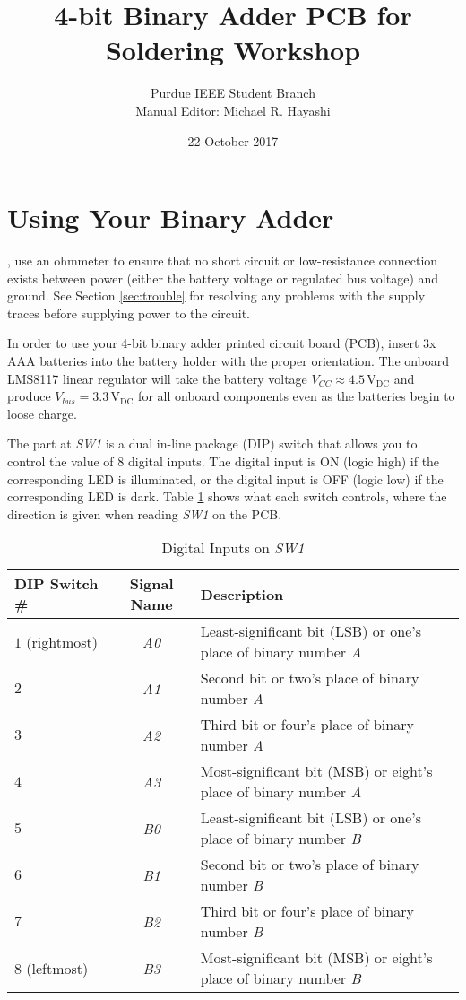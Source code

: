 \documentclass[11pt,oneside]{article}
\title{4-bit Binary Adder PCB for Soldering Workshop}
\author{Purdue IEEE Student Branch \\ Manual Editor: Michael R. Hayashi}
\date{22 October 2017}
\begin{document}
\maketitle
\tableofcontents

\section{Using Your Binary Adder}
\label{sec:using}

\textbf{\color{IEEE-red}{Before powering on your populated printed circuit board}}, use an ohmmeter to ensure that no short circuit or low-resistance connection exists between power (either the battery voltage or regulated bus voltage) and ground. See Section \ref{sec:trouble} for resolving any problems with the supply traces before supplying power to the circuit.

In order to use your 4-bit binary adder printed circuit board (PCB), insert 3x AAA batteries into the battery holder with the proper orientation. The onboard LMS8117 linear regulator will take the battery voltage $V_{CC} \approx 4.5 \, \mathrm{V_{DC}}$ and produce $V_{bus} = 3.3 \, \mathrm{V_{DC}}$ for all onboard components even as the batteries begin to loose charge.

The part at \textit{SW1} is a dual in-line package (DIP) switch that allows you to control the value of 8 digital inputs. The digital input is ON (logic high) if the corresponding LED is illuminated, or the digital input is OFF (logic low) if the corresponding LED is dark. Table \ref{tab:dig_input} shows what each switch controls, where the direction is given when reading \textit{SW1} on the PCB.

\begin{table}[!htb]
	\centering
	\caption{Digital Inputs on \textit{SW1}}
	\begin{tabular}{l | c | l}
		\hline
		DIP Switch \# & Signal Name & Description \\
		\hline
		$1$ (rightmost) & \textit{A0} & Least-significant bit (LSB) or one's place of binary number \textit{A} \\
		$2$ & \textit{A1} & Second bit or two's place of binary number \textit{A} \\
		$3$ & \textit{A2} & Third bit or four's place of binary number \textit{A} \\
		$4$ & \textit{A3} & Most-significant bit (MSB) or eight's place of binary number \textit{A}  \\
		$5$ & \textit{B0} & Least-significant bit (LSB) or one's place of binary number \textit{B} \\
		$6$ & \textit{B1} & Second bit or two's place of binary number \textit{B} \\
		$7$ & \textit{B2} & Third bit or four's place of binary number \textit{B} \\
		$8$ (leftmost) & \textit{B3} & Most-significant bit (MSB) or eight's place of binary number \textit{B} \\
		\hline
	\end{tabular}
	\label{tab:dig_input}
\end{table}
\end{document}

